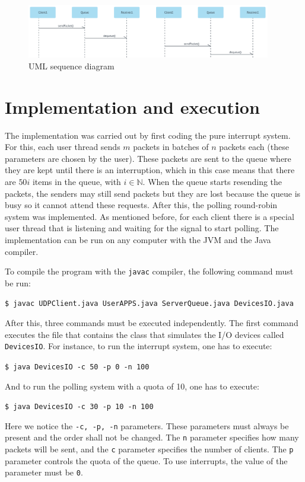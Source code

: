 \documentclass{article}
\begin{document}
\begin{figure}[H]
    \centering
    \includegraphics[width=0.95\textwidth]{UML_seq_diagram.png}
    \caption{UML sequence diagram}
    \label{fig:uml_diagram}
\end{figure}


\section{Implementation and execution}

The implementation was carried out by first coding the pure interrupt system. For this, each user thread sends $m$ packets in batches of $n$ packets each (these parameters are chosen by the user). These packets are sent to the queue where they are kept until there is an interruption, which in this case means that there are $50i$ items in the queue, with $i \in \mathbb{N}$. When the queue starts resending the packets, the senders may still send packets but they are lost because the queue is busy so it cannot attend these requests. After this, the polling round-robin system was implemented. As mentioned before, for each client there is a special user thread that is listening and waiting for the signal to start polling. The implementation can be run on any computer with the JVM and the Java compiler.

To compile the program with the \texttt{javac} compiler, the following command must be run:

\texttt{\$ javac UDPClient.java UserAPPS.java ServerQueue.java DevicesIO.java}

After this, three commands must be executed independently. The first command executes the file that contains the class that simulates the I/O devices called \texttt{DevicesIO}. For instance, to run the interrupt system, one has to execute:

\texttt{\$ java DevicesIO -c 50 -p 0 -n 100}

And to run the polling system with a quota of 10, one has to execute:

\texttt{\$ java DevicesIO -c 30 -p 10 -n 100}

Here we notice the \texttt{-c, -p, -n} parameters. These parameters must always be present and the order shall not be changed. The \texttt{n} parameter specifies how many packets will be sent, and the \texttt{c} parameter specifies the number of clients. The \texttt{p} parameter controls the quota of the queue. To use interrupts, the value of the parameter must be \texttt{0}.
\end{document}
